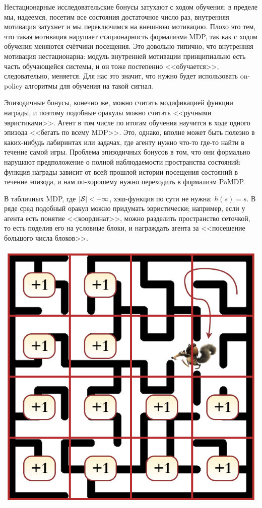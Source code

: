 Нестационарные исследовательские бонусы затухают с ходом обучения; в пределе мы, надеемся, посетим все состояния достаточное число раз, внутренняя мотивация затухнет и мы переключимся на внешнюю мотивацию. Плохо это тем, что такая мотивация нарушает стационарность формализма MDP, так как с ходом обучения меняются счётчики посещения. Это довольно типично, что внутренняя мотивация нестационарна: модуль внутренней мотивации принципиально есть часть обучающейся системы, и он тоже постепенно <<обучается>>, следовательно, меняется. Для нас это значит, что нужно будет использовать on-policy алгоритмы для обучения на такой сигнал.

Эпизодичные бонусы, конечно же, можно считать модификацией функции награды, и поэтому подобные оракулы можно считать <<ручными эвристиками>>. Агент в том числе по итогам обучения научится в ходе одного эпизода <<бегать по всему MDP>>. Это, однако, вполне может быть полезно в каких-нибудь лабиринтах или задачах, где агенту нужно что-то где-то найти в течение самой игры. Проблема эпизодичных бонусов в том, что они формально нарушают предположение о полной наблюдаемости пространства состояний: функция награды зависит от всей прошлой истории посещения состояний в течение эпизода, и нам по-хорошему нужно переходить в формализм PoMDP.

\begin{exampleBox}[righthand ratio=0.25, sidebyside, sidebyside align=center, lower separated=false]{}
В табличных MDP, где $|\mathcal{S}| < +\infty$, хэш-функция по сути не нужна: $h(s) = s$. В ряде сред подобный оракул можно придумать эвристически; например, если у агента есть понятие <<координат>>, можно разделить пространство сеточкой, то есть поделив его на условные блоки, и награждать агента за <<посещение большого числа блоков>>. 

\tcblower
\includegraphics[width=\textwidth]{Images/maze.png}
\end{exampleBox}


